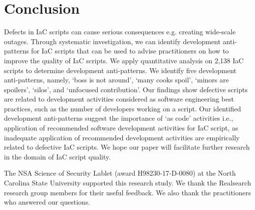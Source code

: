 \documentclass[smallextended]{svjour3}       %
\begin{document}

\section{Conclusion}
\label{conclusion}

Defects in IaC scripts can cause serious consequences e.g. creating wide-scale outages. Through systematic investigation, we can identify development anti-patterns for IaC scripts that can be used to advise practitioners on how to improve the quality of IaC scripts. We apply quantitative analysis on 2,138 IaC scripts to determine development anti-patterns. We identify five development anti-patterns, namely, `boss is not around', `many cooks spoil', `minors are spoilers', `silos', and `unfocused contribution'. Our findings show defective scripts are related to development activities considered as software engineering best practices, such as the number of developers working on a script. Our identified development anti-patterns suggest the importance of `as code' activities i.e., application of recommended software development activities for IaC script, as inadequate application of recommended development activities are empirically related to defective IaC scripts. We hope our paper will facilitate further research in the domain of IaC script quality.         





\begin{acknowledgements}
The NSA Science of Security Lablet (award H98230-17-D-0080) at the North Carolina State University supported this research study. We thank the Realsearch research group members for their useful feedback. We also thank the practitioners who answered our questions.
\end{acknowledgements}





\balance 
\end{document}
